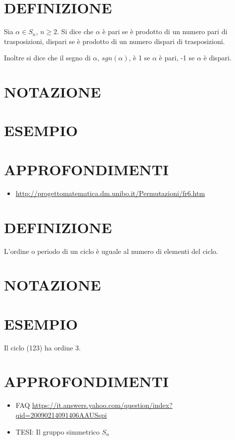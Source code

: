 \section{DEFINIZIONE}
Sia $\alpha \in S_n$, $n \geq 2$. Si dice che $\alpha$ è pari se è prodotto di un numero pari di trasposizioni, dispari se è prodotto di un 
numero dispari di trasposizioni.

Inoltre si dice che il segno di $\alpha$, $sgn(\alpha)$, è 1 se $\alpha$ è pari, -1 se $\alpha$ è dispari.

\section{NOTAZIONE}

\section{ESEMPIO}

\section{APPROFONDIMENTI}
\begin{itemize}
 \item \url{http://progettomatematica.dm.unibo.it/Permutazioni/fr6.htm}
\end{itemize}




\section{DEFINIZIONE}
L'ordine o periodo di un ciclo è uguale al numero di elementi del ciclo.

\section{NOTAZIONE}

\section{ESEMPIO}
Il ciclo (123) ha ordine 3.

\section{APPROFONDIMENTI}
\begin{itemize}
 \item FAQ \href{https://it.answers.yahoo.com/question/index?qid=20090214091406AAUSspi}{https://it.answers.yahoo.com/question/index?qid=20090214091406AAUSspi}
 \item TESI: Il gruppo simmetrico $S_n$ \cite{simmetrico1}
\end{itemize}




